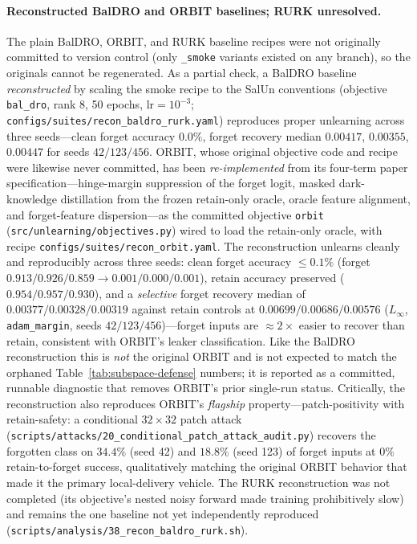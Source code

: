 \documentclass{article}
\begin{document}
\paragraph{Reconstructed BalDRO and ORBIT baselines; RURK unresolved.} The plain BalDRO, ORBIT, and RURK baseline recipes were not originally committed to version control (only \texttt{\_smoke} variants existed on any branch), so the originals cannot be regenerated. As a partial check, a BalDRO baseline \emph{reconstructed} by scaling the smoke recipe to the SalUn conventions (objective \texttt{bal\_dro}, rank 8, 50 epochs, $\mathrm{lr}=10^{-3}$; \texttt{configs/suites/recon\_baldro\_rurk.yaml}) reproduces proper unlearning across three seeds---clean forget accuracy $0.0\%$, forget recovery median $0.00417$, $0.00355$, $0.00447$ for seeds $42/123/456$. ORBIT, whose original objective code and recipe were likewise never committed, has been \emph{re-implemented} from its four-term paper specification---hinge-margin suppression of the forget logit, masked dark-knowledge distillation from the frozen retain-only oracle, oracle feature alignment, and forget-feature dispersion---as the committed objective \texttt{orbit} (\texttt{src/unlearning/objectives.py}) wired to load the retain-only oracle, with recipe \texttt{configs/suites/recon\_orbit.yaml}. The reconstruction unlearns cleanly and reproducibly across three seeds: clean forget accuracy $\le\!0.1\%$ (forget $0.913/0.926/0.859 \to 0.001/0.000/0.001$), retain accuracy preserved ($0.954/0.957/0.930$), and a \emph{selective} forget recovery median of $0.00377/0.00328/0.00319$ against retain controls at $0.00699/0.00686/0.00576$ ($L_\infty$, \texttt{adam\_margin}, seeds $42/123/456$)---forget inputs are $\approx\!2\times$ easier to recover than retain, consistent with ORBIT's leaker classification. Like the BalDRO reconstruction this is \emph{not} the original ORBIT and is not expected to match the orphaned Table~\ref{tab:subspace-defense} numbers; it is reported as a committed, runnable diagnostic that removes ORBIT's prior single-run status. Critically, the reconstruction also reproduces ORBIT's \emph{flagship} property---patch-positivity with retain-safety: a conditional $32\times32$ patch attack (\texttt{scripts/attacks/20\_conditional\_patch\_attack\_audit.py}) recovers the forgotten class on $34.4\%$ (seed 42) and $18.8\%$ (seed 123) of forget inputs at $0\%$ retain-to-forget success, qualitatively matching the original ORBIT behavior that made it the primary local-delivery vehicle. The RURK reconstruction was not completed (its objective's nested noisy forward made training prohibitively slow) and remains the one baseline not yet independently reproduced (\texttt{scripts/analysis/38\_recon\_baldro\_rurk.sh}).
\end{document}
